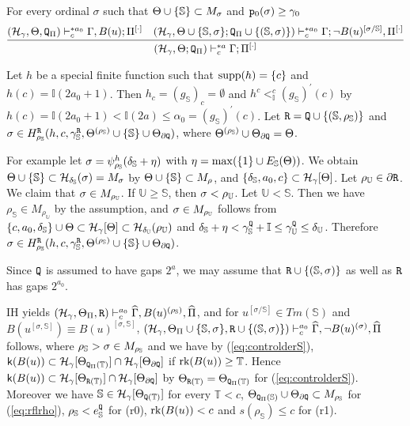 \documentclass{article}
\newcommand{\mS}{\mathbb{S}}
\newcommand{\mI}{\mathbb{I}}
\newcommand{\mT}{\mathbb{T}}
\newcommand{\mU}{\mathbb{U}}
\begin{document}
For every ordinal $\sigma$ such that
$\Theta\cup\{\mS\}\subset M_{\sig}$ and ${\tt p}_{0}(\sigma)\geq\gamma_{0}$
{\small
\[
\infer{(\calh_{\gam},\Tht;{\tt Q}_{\Pi})\vdash^{* a}_{c}\Gam;\Pi^{[\cdot]}}
{
(\mathcal{H}_{\gamma},\Tht, {\tt Q}_{\Pi})\vdash^{* a_{0}}_{c}
\Gamma, B(u);\Pi^{[\cdot]}
&
(\mathcal{H}_{\gamma},\Tht\cup\{\mS,\sig\};{\tt Q}_{\Pi}\cup\{(\mS,\sig)\}
)\vdash^{* a_{0}}_{c}
\Gamma;\lnot B(u)^{[\sigma/\mS]}, \Pi^{[\cdot]}
}
\]
}



Let $h$ be a special finite function such that ${\rm supp}(h)=\{c\}$ and
$h(c)=\mathbb{I}(2a_{0}+1)$.
Then $h_{c}=(g_{\mS})_{c}=\emptyset$ and $h^{c}<_{\mI}^{c}(g_{\mS})^{\prime}(c)$
by $h(c)=\mathbb{I}(2a_{0}+1)<\mathbb{I}(2a)\leq\alpha_{0}=(g_{\mS})^{\prime}(c)$.
Let ${\tt R}={\tt Q}\cup\{(\mS,\rho_{\mS})\}$
and $\sigma\in H^{{\tt R}}_{\rho_{\mS}}(h,c,\gam^{{\tt R}}_{\mS},\Tht^{(\rho_{\mS})}\cup\{\mS\}\cup\Tht_{\partial{\tt Q}})$, 
where
$\Tht^{(\rho_{\mS})}\cup\Tht_{\partial{\tt Q}}=\Tht$.

For example let
$\sig=\psi_{\rho_{\mS}}^{h}(\del_{\mS}+\eta)$ with $\eta=\max(\{1\}\cup E_{\mS}(\Tht))$.
We obtain $\Tht\cup\{\mS\}\subset \calh_{\del_{\mS}}(\sig)=M_{\sig}$ by $\Tht\cup\{\mS\}\subset M_{\rho}$, and
$\{\del_{\mS},a_{0},c\}\subset\mathcal{H}_{\gam}[\Theta]$.
Let $\rho_{\mU}\in\partial{{\tt R}}$. We claim that $\sig\in M_{\rho_{\mU}}$.
If $\mU\geq\mS$, then $\sig<\rho_{\mU}$.
Let $\mU<\mS$. Then we have $\rho_{\mS}\in M_{\rho_{\mU}}$ by the assumption,
and $\sig\in M_{\rho_{\mU}}$ follows from 
$\{c,a_{0},\del_{\mS}\}\cup\Tht\subset\calh_{\gam}[\Tht]\subset\calh_{\del_{\mU}}(\rho_{\mU})$
and $\del_{\mS}+\eta<\gam_{\mS}^{{\tt Q}}+\mI\leq\gam_{\mU}^{{\tt Q}}\leq\del_{\mU}$.
Therefore $\sigma\in H^{{\tt R}}_{\rho_{\mS}}(h,c,\gam^{{\tt R}}_{\mS},\Tht^{(\rho_{\mS})}\cup\{\mS\}\cup
\Tht_{\partial{\tt Q}})$.

Since ${\tt Q}$ is assumed to have gaps $2^{a}$,
we may assume that
${\tt R}\cup\{(\mS,\sigma)\}$ as well as ${\tt R}$
has gaps $2^{a_{0}}$.

IH yields
$
(\mathcal{H}_{\gam},\Tht_{\Pi},{\tt R})\vdash^{a_{0}}_{c}
\widehat{\Gamma},B(u)^{(\rho_{\mS})},\widehat{\Pi}
$, and for $u^{[\sigma/\mS]}\in Tm(\mS)$ and 
$B(u^{[\sigma,\mS]})\equiv B(u)^{[\sigma,\mathbb{S}]}$,
$(\mathcal{H}_{\gamma},\Tht_{\Pi}\cup\{\mS,\sig\},{\tt R}\cup\{(\mS,\sigma)\}
)\vdash^{a_{0}}_{c}
\widehat{\Gamma},\lnot B(u)^{(\sigma)},\widehat{\Pi}
$ follows, where $\rho_{\mS}>\sig\in M_{\rho_{\mS}}$ and we have by (\ref{eq:controlderS}),
$\sfk(B(u))\subset\calh_{\gam}[\Tht_{{\tt Q}_{\Pi}(\mT)}]\cap\calh_{\gam}[\Tht_{\partial{\tt Q}}]$
if $\rk(B(u))\geq\mT$.
Hence $\sfk(B(u))\subset\calh_{\gam}[\Tht_{{\tt R}(\mT)}]\cap\calh_{\gam}[\Tht_{\partial{\tt Q}}]$ by $\Tht_{{\tt R}(\mT)}=\Tht_{{\tt Q}_{\Pi}(\mT)}$
for (\ref{eq:controlderS}).
Moreover
we have 
$\mS\in\calh_{\gam}[\Tht_{{\tt Q}(\mT)}]$ for every $\mT<c$,
$\Tht_{{\tt Q}_{\Pi}(\mS)}\cup\Tht_{\partial{\tt Q}}\subset M_{\rho_{\mS}}$ for (\ref{eq:rflrho}),
$\rho_{\mS}<e^{{\tt Q}}_{\mS}$
 for (r0),
$\mbox{{\rm rk}}(B(u))<c$ and $s(\rho_{\mS})\leq c$ for (r1).
\end{document}
